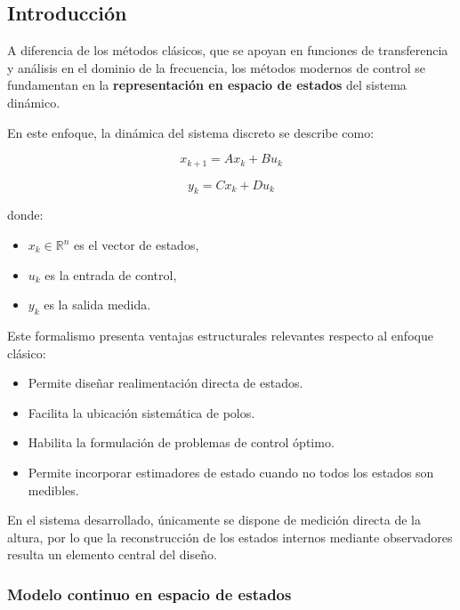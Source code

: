 
\subsection{Introducción}

A diferencia de los métodos clásicos, que se apoyan en funciones
de transferencia y análisis en el dominio de la frecuencia,
los métodos modernos de control se fundamentan en la
\textbf{representación en espacio de estados} del sistema dinámico.

En este enfoque, la dinámica del sistema discreto se describe como:

\begin{equation}
	x_{k+1}=Ax_k+Bu_k
	\label{eq:din_estado}
\end{equation}

\begin{equation}
	y_k=Cx_k+Du_k
	\label{eq:din_salida}
\end{equation}

donde:

\begin{itemize}
	\item $x_k \in \mathbb{R}^n$ es el vector de estados,
	\item $u_k$ es la entrada de control,
	\item $y_k$ es la salida medida.
\end{itemize}

Este formalismo presenta ventajas estructurales relevantes
respecto al enfoque clásico:

\begin{itemize}
	\item Permite diseñar realimentación directa de estados.
	\item Facilita la ubicación sistemática de polos.
	\item Habilita la formulación de problemas de control óptimo.
	\item Permite incorporar estimadores de estado cuando no todos
	los estados son medibles.
\end{itemize}

En el sistema desarrollado, únicamente se dispone de medición directa
de la altura, por lo que la reconstrucción de los estados internos
mediante observadores resulta un elemento central del diseño.

\subsubsection{Modelo continuo en espacio de estados}

